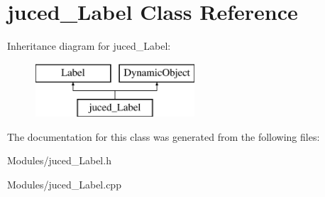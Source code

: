 \hypertarget{classjuced___label}{\section{juced\-\_\-\-Label Class Reference}
\label{classjuced___label}
}
Inheritance diagram for juced\-\_\-\-Label\-:\begin{figure}[H]
\begin{center}
\leavevmode
\includegraphics[height=2.000000cm]{classjuced___label}
\end{center}
\end{figure}


The documentation for this class was generated from the following files\-:\begin{DoxyCompactItemize}
\item 
Modules/juced\-\_\-\-Label.\-h\item 
Modules/juced\-\_\-\-Label.\-cpp\end{DoxyCompactItemize}
